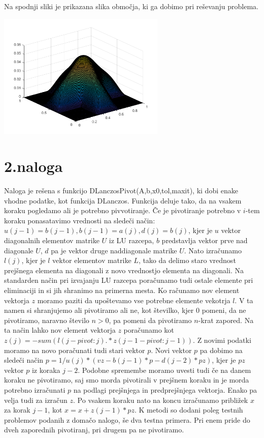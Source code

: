 \documentclass[11pt]{article} %
\begin{document}
Na spodnji sliki je prikazana slika območja, ki ga dobimo pri reševanju problema.

\includegraphics[width=0.6\textwidth]{slika1}

\section{2.naloga}

Naloga je rešena s funkcijo DLanczosPivot(A,b,x0,tol,maxit), ki dobi enake vhodne podatke, kot funkcija DLanczos. Funkcija deluje tako, da na vsakem koraku pogledamo ali je potrebno pivvotiranje. Če je pivotiranje potrebno v $i$-tem koraku ponasatavimo vrednosti  na sledeči način:
$u(j-1) = b(j-1), b(j-1) = a(j), d(j) = b(j)$, kjer je $u$ vektor diagonalnih elementov matrike $U$ iz LU razcepa, $b$ predstavlja vektor prve nad diagonale $U$, $d$ pa je vektor druge naddiagonale matrike $U$. Nato izračunamo $l(j)$, kjer je $l$ vektor elementov matrike $L$, tako da delimo staro vrednost prejšnega elementa na diagonali z novo vrednostjo elementa
na diagonali. Na standarden način pri izvajanju LU razcepa poračunamo tudi ostale elemente pri eliminaciji in si jih shranimo na primerna mesta. Ko računamo nov element vektorja $z$ moramo paziti da upoštevamo vse potrebne elemente vekotrja $l$. V ta namen si shranjujemo ali pivotiramo ali ne, kot številko, kjer $0$ pomeni, da ne pivotiramo, naravno število $n>0$, pa pomeni da pivotiramo $n$-krat zapored. Na ta način lahko nov element vektorja $z$ poračunamo kot  $z(j) = -sum(l(j-pivot:j).*z(j-1-pivot:j-1))$. Z novimi podatki moramo na novo poračunati tudi stari vektor $p$. Novi vektor $p$ pa dobimo na sledeči način $p = 1/u(j)*(vz - b(j-1)*p - d(j-2)*pz)$, kjer je $pz$ vektor $p$ iz koraka $j-2$. Podobne spremembe moramo uvesti tudi če na danem koraku ne pivotiramo, saj smo morda pivotirali v prejšnem koraku in je morda potrebno izračunati $p$ na podlagi prejšnjega in predprejšnjega vektorja. Enako pa velja tudi za izračun $z$. Po vsakem koraku nato na koncu izračunamo približek $x$ za korak $j-1$, kot $x = x + z(j-1)*pz$. K metodi so dodani poleg testnih problemov podanih z domačo nalogo, še dva testna primera. Pri enem pride do dveh zaporednih pivotiranj, pri drugem pa ne pivotiramo.
\end{document}
